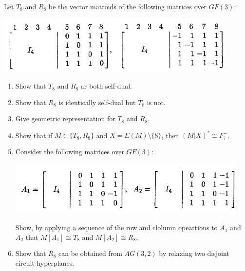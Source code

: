 \prob
{\label{t2:p7}
    Let $T_8$ and $R_8$ be the vector matroids of the following matrices over $GF(3)$:\pn
            \begin{center}
                \includegraphics[width=12cm]{Test2/Problem7/FirstMatrices.png}
            \end{center}\pn
    
    \begin{enumerate}[label=(\roman*)]
        \item Show that $T_8$ and $R_8$ ar both self-dual.
        
        \item Show that $R_8$ is identically self-dual but $T_8$ is not.
        
        \item Give geometric representation for $T_8$ and $R_8$.
        
        \item Show that if $M \in \{T_8, R_8\}$ and $X = E(M) \setminus \{8\}$, then
                $(M|X)^* \cong F_7^-$.
                
        \item Consider the following matrices over $GF(3)$:
            \begin{center}
                \includegraphics[width=12cm]{Test2/Problem7/SecondMatrices.png}
            \end{center}\pn
            Show, by applying a sequence of the row and clolumn opeartions to $A_1$ and $A_2$
            that $M[A_1] \cong T_8$ and $M[A_2] \cong R_8$.
            
        \item Show that $R_8$ can be obtained from $AG(3, 2)$ by relaxing two disjoint 
            circuit-hyperplanes.
    \end{enumerate}
}
